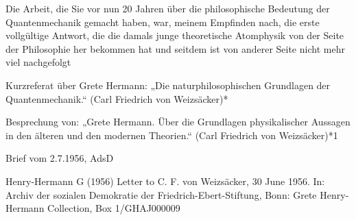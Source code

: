 Die Arbeit, die Sie vor nun 20 Jahren über die philosophische Bedeutung
der Quantenmechanik gemacht haben, war, meinem Empfinden nach, die erste
vollgültige Antwort, die die damals junge theoretische Atomphysik von der Seite
der Philosophie her bekommen hat und seitdem ist von anderer Seite nicht mehr viel nachgefolgt


Kurzreferat über Grete Hermann: „Die
naturphilosophischen Grundlagen der
Quantenmechanik.“ (Carl Friedrich von
Weizsäcker)*

Besprechung von: „Grete Hermann. Über
die Grundlagen physikalischer Aussagen in
den älteren und den modernen Theorien.“
(Carl Friedrich von Weizsäcker)*1

Brief vom 2.7.1956, AdsD

Henry-Hermann G (1956) Letter to C. F. von Weizsäcker, 30 June 1956. In: Archiv der
sozialen Demokratie der Friedrich-Ebert-Stiftung, Bonn: Grete Henry-Hermann Collection, Box
1/GHAJ000009

